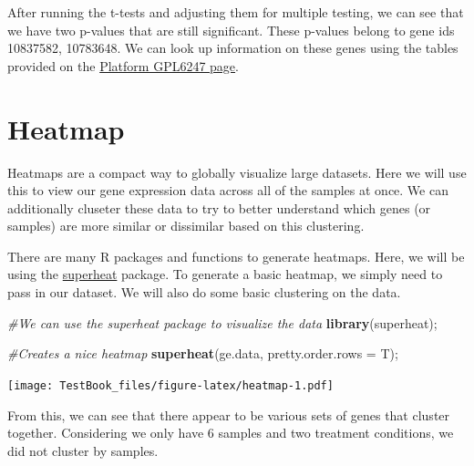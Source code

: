 \documentclass[
]{book}
\newenvironment{Shaded}{\begin{snugshade}}{\end{snugshade}}
\newcommand{\CommentTok}[1]{\textcolor[rgb]{0.56,0.35,0.01}{\textit{#1}}}
\newcommand{\DataTypeTok}[1]{\textcolor[rgb]{0.13,0.29,0.53}{#1}}
\newcommand{\KeywordTok}[1]{\textcolor[rgb]{0.13,0.29,0.53}{\textbf{#1}}}
\newcommand{\NormalTok}[1]{#1}
\begin{document}
After running the t-tests and adjusting them for multiple testing, we can see that we have two p-values that are still significant. These p-values belong to gene ids 10837582, 10783648. We can look up information on these genes using the tables provided on the \href{https://www.ncbi.nlm.nih.gov/geo/query/acc.cgi?acc=GPL6247}{Platform GPL6247 page}.

\hypertarget{heatmap}{%
\chapter{Heatmap}\label{heatmap}}

Heatmaps are a compact way to globally visualize large datasets. Here we will use this to view our gene expression data across all of the samples at once. We can additionally cluseter these data to try to better understand which genes (or samples) are more similar or dissimilar based on this clustering.

There are many R packages and functions to generate heatmaps. Here, we will be using the \href{https://rlbarter.github.io/superheat/}{superheat} package. To generate a basic heatmap, we simply need to pass in our dataset. We will also do some basic clustering on the data.

\begin{Shaded}
\begin{Highlighting}[]
\CommentTok{#We can use the superheat package to visualize the data}
\KeywordTok{library}\NormalTok{(superheat);}

\CommentTok{#Creates a nice heatmap}
\KeywordTok{superheat}\NormalTok{(ge.data,}
          \DataTypeTok{pretty.order.rows =}\NormalTok{ T);}
\end{Highlighting}
\end{Shaded}

\texttt{[image: TestBook\_files/figure-latex/heatmap-1.pdf]}

From this, we can see that there appear to be various sets of genes that cluster together. Considering we only have 6 samples and two treatment conditions, we did not cluster by samples.
\end{document}
